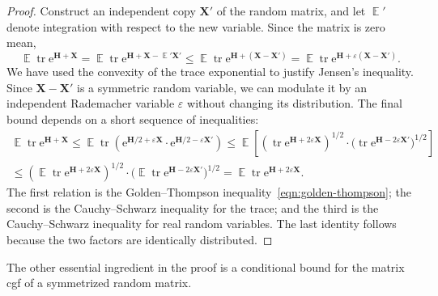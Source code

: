 \documentclass[11pt,letterpaper,twoside,reqno,draft]{amsart}
\theoremstyle{remark}
\numberwithin{equation}{section}
\numberwithin{thm}{section}
\begin{document}
\begin{proof}
Construct an independent copy ${\bm{{X}}}'$ of the random matrix, and let ${\operatorname{\mathbb{E}}}'$ denote integration with respect to the new variable.  Since the matrix is zero mean,
$$
{\operatorname{\mathbb{E}}} {\operatorname{tr}} {\mathrm{e}}^{{\bm{{H}}} + {\bm{{X}}}}
	= {\operatorname{\mathbb{E}}} {\operatorname{tr}} {\mathrm{e}}^{{\bm{{H}}} + {\bm{{X}}} - {\operatorname{\mathbb{E}}}' {\bm{{X}}}'}
	\leq {\operatorname{\mathbb{E}}} {\operatorname{tr}} {\mathrm{e}}^{{\bm{{H}}} + ({\bm{{X}}} - {\bm{{X}}}')}
	= {\operatorname{\mathbb{E}}} {\operatorname{tr}} {\mathrm{e}}^{{\bm{{H}}} + {\varepsilon}({\bm{{X}}} - {\bm{{X}}}')}.
$$
We have used the convexity of the trace exponential to justify Jensen's inequality.
Since ${\bm{{X}}} - {\bm{{X}}}'$ is a symmetric random variable, we can modulate it by an independent Rademacher variable ${\varepsilon}$ without changing its distribution.  The final bound depends on a short sequence of inequalities:
\begin{multline*}
{\operatorname{\mathbb{E}}} {\operatorname{tr}} {\mathrm{e}}^{{\bm{{H}}} + {\bm{{X}}}}
	\leq {\operatorname{\mathbb{E}}} {\operatorname{tr}} \left(
	{\mathrm{e}}^{ {\bm{{H}}}/2 + {\varepsilon} {\bm{{X}}} } \cdot
	{\mathrm{e}}^{ {\bm{{H}}}/2 - {\varepsilon} {\bm{{X}}}' } \right)
	\leq {\operatorname{\mathbb{E}}} \left[ \left( {\operatorname{tr}} {\mathrm{e}}^{{\bm{{H}}} + 2{\varepsilon}{\bm{{X}}}} \right)^{1/2} \cdot
	\big( {\operatorname{tr}} {\mathrm{e}}^{{\bm{{H}}} - 2{\varepsilon}{\bm{{X}}}'} \big)^{1/2} \right] \\
	\leq \left({\operatorname{\mathbb{E}}} {\operatorname{tr}} {\mathrm{e}}^{{\bm{{H}}} + 2{\varepsilon}{\bm{{X}}}} \right)^{1/2} \cdot
	\big( {\operatorname{\mathbb{E}}} {\operatorname{tr}} {\mathrm{e}}^{{\bm{{H}}} - 2{\varepsilon}{\bm{{X}}}'} \big)^{1/2}
	= {\operatorname{\mathbb{E}}} {\operatorname{tr}} {\mathrm{e}}^{{\bm{{H}}} + 2{\varepsilon}{\bm{{X}}}}.
\end{multline*}
The first relation is the Golden--Thompson inequality~\eqref{eqn:golden-thompson}; the second is the Cauchy--Schwarz inequality 
for the trace; and the third  is the Cauchy--Schwarz inequality 
for real random variables.  The last identity follows because the two factors are identically distributed.
\end{proof}

The other essential ingredient in the proof is a conditional bound for the matrix cgf of a symmetrized random matrix.
\end{document}
